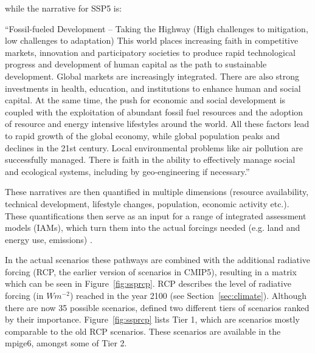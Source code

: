 while the narrative for SSP5 is:

\begin{center}
  \enquote{Fossil-fueled Development – Taking the Highway (High challenges to mitigation, low challenges to adaptation) This world places increasing faith in competitive markets, innovation and participatory societies to produce rapid technological progress and development of human capital as the path to sustainable development. Global markets are increasingly integrated. There are also strong investments in health, education, and institutions to enhance human and social capital. At the same time, the push for economic and social development is coupled with the exploitation of abundant fossil fuel resources and the adoption of resource and energy intensive lifestyles around the world. All these factors lead to rapid growth of the global economy, while global population peaks and declines in the 21st century. Local environmental problems like air pollution are successfully managed. There is faith in the ability to effectively manage social and ecological systems, including by geo-engineering if necessary.} \cite{riahi_shared_2017}
\end{center}

These narratives are then quantified in multiple dimensions (resource availability, technical development, lifestyle changes, population, economic activity etc.). 
These quantifications then serve as an input for a range of integrated assessment models (IAMs), which turn them into the actual forcings needed (e.g. land and energy use, emissions) \cite{riahi_shared_2017}. 

In the actual scenarios these pathways are combined with the additional radiative forcing (RCP, the earlier version of scenarios in CMIP5), resulting in a matrix which can be seen in Figure~\ref{fig:ssprcp}. 
RCP describes the level of radiative forcing (in $Wm^{-2}$) reached in the year 2100 (see Section~\ref{sec:climate}).
Although there are now 35 possible scenarios, \citeauthor{oneill_scenario_2016} defined two different tiers of scenarios ranked by their importance. 
Figure~\ref{fig:ssprcp} lists Tier 1, which are scenarios mostly comparable to the old RCP scenarios. 
These scenarios are available in the \ac{mpige6}, amongst some of Tier 2. \cite{oneill_scenario_2016, riahi_shared_2017, bottinger_michael_ssp_nodate}

